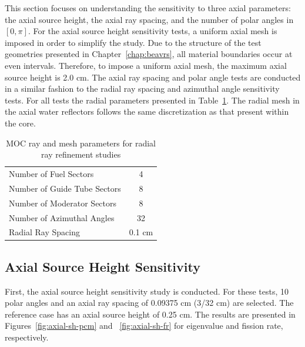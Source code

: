 This section focuses on understanding the sensitivity to three axial parameters: the axial source height, the axial ray spacing, and the number of polar angles in $[0, \pi]$. For the axial source height sensitivity tests, a uniform axial mesh is imposed in order to simplify the study. Due to the structure of the test geometries presented in Chapter~\ref{chap:beavrs}, all material boundaries occur at even intervals. Therefore, to impose a uniform axial mesh, the maximum axial source height is 2.0 cm. The axial ray spacing and polar angle tests are conducted in a similar fashion to the radial ray spacing and azimuthal angle sensitivity tests. For all tests the radial parameters presented in Table~\ref{tab:axial-test-radial-params}. The radial mesh in the axial water reflectors follows the same discretization as that present within the core.

\begin{table}[ht]
	\centering
	\caption{MOC ray and mesh parameters for radial ray refinement studies}
	\medskip
	\begin{tabular}{lc}
		\hline
		Number of Fuel Sectors & 4 \\
		Number of Guide Tube Sectors & 8 \\
		Number of Moderator Sectors & 8 \\
		Number of Azimuthal Angles & 32 \\
		Radial Ray Spacing & 0.1 cm \\
		\hline
	\end{tabular}
	\label{tab:axial-test-radial-params}
\end{table}

\subsection{Axial Source Height Sensitivity}
\label{sec:axial-source-height-sensitivity}

First, the axial source height sensitivity study is conducted. For these tests, 10 polar angles and an axial ray spacing of 0.09375 cm (3/32 cm) are selected. The reference case has an axial source height of 0.25 cm. The results are presented in Figures~\ref{fig:axial-sh-pcm} and ~\ref{fig:axial-sh-fr} for eigenvalue and fission rate, respectively. 

